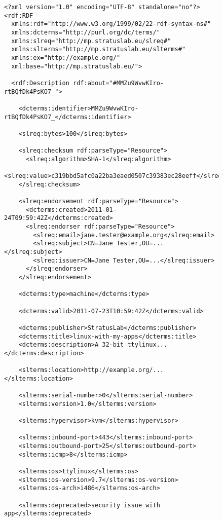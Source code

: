 \begin{figure}
\begin{center}
\tiny
\begin{verbatim}
<?xml version="1.0" encoding="UTF-8" standalone="no"?>
<rdf:RDF 
  xmlns:rdf="http://www.w3.org/1999/02/22-rdf-syntax-ns#"
  xmlns:dcterms="http://purl.org/dc/terms/"
  xmlns:slreq="http://mp.stratuslab.eu/slreq#"
  xmlns:slterms="http://mp.stratuslab.eu/slterms#"
  xmlns:ex="http://example.org/"
  xml:base="http://mp.stratuslab.eu/">

  <rdf:Description rdf:about="#MMZu9WvwKIro-rtBQfDk4PsKO7_">

    <dcterms:identifier>MMZu9WvwKIro-rtBQfDk4PsKO7_</dcterms:identifier>

    <slreq:bytes>100</slreq:bytes>

    <slreq:checksum rdf:parseType="Resource">
      <slreq:algorithm>SHA-1</slreq:algorithm>
      <slreq:value>c319bbd5afc0a22ba3eaed0507c39383ec28eeff</slreq:value>
    </slreq:checksum>

    <slreq:endorsement rdf:parseType="Resource">
      <dcterms:created>2011-01-24T09:59:42Z</dcterms:created>
      <slreq:endorser rdf:parseType="Resource">
        <slreq:email>jane.tester@example.org</slreq:email>
        <slreq:subject>CN=Jane Tester,OU=...</slreq:subject>
        <slreq:issuer>CN=Jane Tester,OU=...</slreq:issuer>
      </slreq:endorser>
    </slreq:endorsement>

    <dcterms:type>machine</dcterms:type>

    <dcterms:valid>2011-07-23T10:59:42Z</dcterms:valid>

    <dcterms:publisher>StratusLab</dcterms:publisher>
    <dcterms:title>linux-with-my-apps</dcterms:title>
    <dcterms:description>A 32-bit ttylinux...</dcterms:description>

    <slterms:location>http://example.org/...</slterms:location>

    <slterms:serial-number>0</slterms:serial-number>
    <slterms:version>1.0</slterms:version>

    <slterms:hypervisor>kvm</slterms:hypervisor>

    <slterms:inbound-port>443</slterms:inbound-port>
    <slterms:outbound-port>25</slterms:outbound-port>
    <slterms:icmp>8</slterms:icmp>

    <slterms:os>ttylinux</slterms:os>
    <slterms:os-version>9.7</slterms:os-version>
    <slterms:os-arch>i486</slterms:os-arch>

    <slterms:deprecated>security issue with app</slterms:deprecated>


\end{verbatim}
\end{center}
\end{figure}
